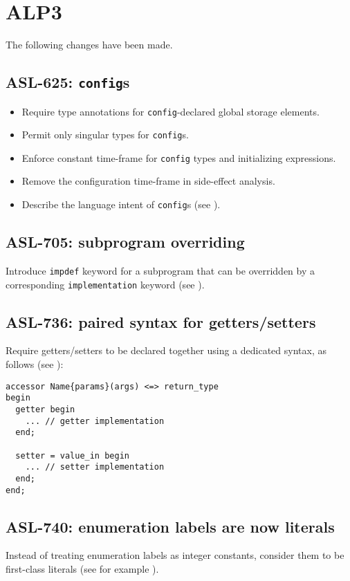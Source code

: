 \section{ALP3}

The following changes have been made.

\subsection{ASL-625: \texttt{config}s}
\begin{itemize}
  \item Require type annotations for \texttt{config}-declared global storage elements.
  \item Permit only singular types for \texttt{config}s.
  \item Enforce constant time-frame for \texttt{config} types and initializing expressions.
  \item Remove the configuration time-frame in side-effect analysis.
  \item Describe the language intent of \texttt{config}s (see ).
\end{itemize}

\subsection{ASL-705: subprogram overriding}
Introduce \texttt{impdef} keyword for a subprogram that can be overridden by a corresponding \texttt{implementation} keyword (see ).

\subsection{ASL-736: paired syntax for getters/setters}
Require getters/setters to be declared together using a dedicated syntax, as follows
(see ):
\begin{lstlisting}
accessor Name{params}(args) <=> return_type
begin
  getter begin
    ... // getter implementation
  end;

  setter = value_in begin
    ... // setter implementation
  end;
end;
\end{lstlisting}

\subsection{ASL-740: enumeration labels are now literals}
Instead of treating enumeration labels as integer constants, consider them to be first-class literals (see for example ).

